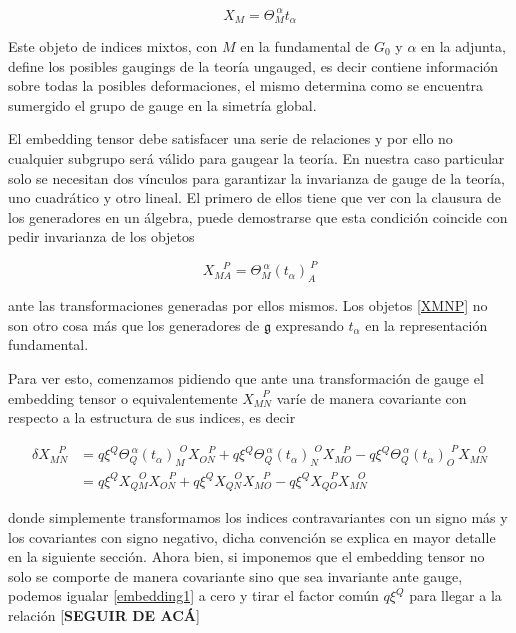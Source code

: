 \documentclass{article}
\numberwithin{equation}{section}
\begin{document}
\begin{equation}
X_M = \Theta_M^{\ \alpha} t_{\alpha}
\end{equation}


Este objeto de indices mixtos, con $ M $ en la fundamental de $ G_0 $ y $ \alpha $ en la adjunta, define los posibles gaugings de la teoría ungauged, es decir contiene información sobre todas la posibles deformaciones, el mismo determina como se encuentra sumergido el grupo de gauge en la simetría global. 

El embedding tensor debe satisfacer una serie de relaciones y por ello no cualquier subgrupo será válido para gaugear la teoría. En nuestra caso particular solo se necesitan dos vínculos para garantizar la invarianza de gauge de la teoría, uno cuadrático y otro lineal. El primero de ellos tiene que ver con la clausura de los generadores en un álgebra, puede demostrarse que esta condición coincide con pedir invarianza de los objetos 


\begin{equation}\label{XMNP}
X_{M A}^{\ \ \ \ P} = \Theta_M^{\ \alpha} \left(t_{\alpha}\right)_A^{\ P}
\end{equation}

ante las transformaciones generadas por ellos mismos. Los objetos \ref{XMNP} no son otro cosa más que los generadores de $ \mathfrak{g} $ expresando $ t_{\alpha} $ en la representación fundamental.

Para ver esto, comenzamos pidiendo que ante una transformación de gauge el embedding tensor o equivalentemente $ X_{M N}^{\ \ \ \ P}  $ varíe de manera covariante con respecto a la estructura de sus indices, es decir

\begin{equation}\label{embedding1}
\begin{aligned}
\delta X_{M N}^{\ \ \ \ P} &= q \xi^Q \Theta_Q^{\ \alpha} \left(t_{\alpha}\right)_M^{\ \ O} X_{O N}^{\ \ \ \ P} + q \xi^Q \Theta_Q^{\ \alpha} \left(t_{\alpha}\right)_N^{\ \ O} X_{M O}^{\ \ \ \ P} - q \xi^Q \Theta_Q^{\ \alpha} \left(t_{\alpha}\right)_O^{\ \ P} X_{M N}^{\ \ \ \ O}\\
&= q \xi^Q  X_{Q M}^{\ \ \ \ O} X_{O N}^{\ \ \ \ P} + q \xi^Q X_{Q N}^{\ \ \ \ O} X_{M O}^{\ \ \ \ P} - q \xi^Q X_{Q O}^{\ \ \ \ P} X_{M N}^{\ \ \ \ O}
\end{aligned}
\end{equation}

donde simplemente transformamos los indices contravariantes con un signo más y los covariantes con signo negativo, dicha convención se explica en mayor detalle en la siguiente sección. Ahora bien, si imponemos que el embedding tensor no solo se comporte de manera covariante sino que sea invariante ante gauge, podemos igualar \ref{embedding1} a cero y tirar el factor común $ q \xi^Q $ para llegar a la relación [\textbf{SEGUIR DE ACÁ}]
\end{document}
